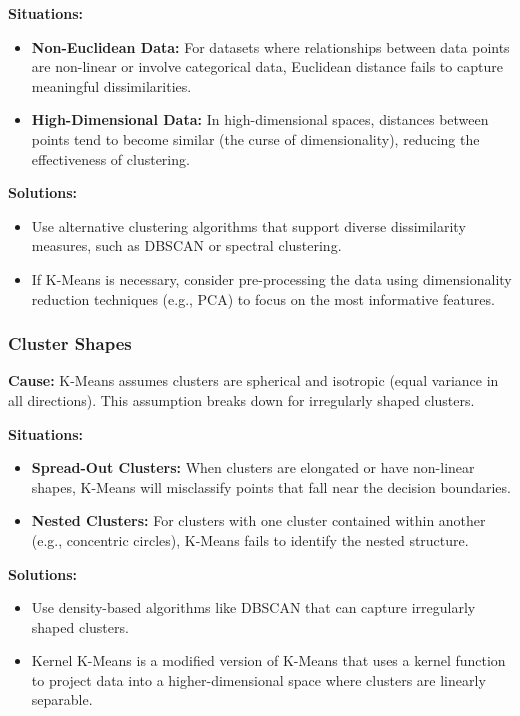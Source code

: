 \documentclass[12pt,a4paper]{article}
\begin{document}
\textbf{Situations:}
\begin{itemize}
    \item \textbf{Non-Euclidean Data:} For datasets where relationships between data points are non-linear or involve categorical data, Euclidean distance fails to capture meaningful dissimilarities.
    \item \textbf{High-Dimensional Data:} In high-dimensional spaces, distances between points tend to become similar (the curse of dimensionality), reducing the effectiveness of clustering.
\end{itemize}

\textbf{Solutions:}
\begin{itemize}
    \item Use alternative clustering algorithms that support diverse dissimilarity measures, such as DBSCAN or spectral clustering.
    \item If K-Means is necessary, consider pre-processing the data using dimensionality reduction techniques (e.g., PCA) to focus on the most informative features.
\end{itemize}

\subsubsection{Cluster Shapes}
\textbf{Cause:}
K-Means assumes clusters are spherical and isotropic (equal variance in all directions). This assumption breaks down for irregularly shaped clusters.

\textbf{Situations:}
\begin{itemize}
    \item \textbf{Spread-Out Clusters:} When clusters are elongated or have non-linear shapes, K-Means will misclassify points that fall near the decision boundaries.
    \item \textbf{Nested Clusters:} For clusters with one cluster contained within another (e.g., concentric circles), K-Means fails to identify the nested structure.
\end{itemize}

\textbf{Solutions:}
\begin{itemize}
    \item Use density-based algorithms like DBSCAN that can capture irregularly shaped clusters.
    \item Kernel K-Means is a modified version of K-Means that uses a kernel function to project data into a higher-dimensional space where clusters are linearly separable.
\end{itemize}
\end{document}
